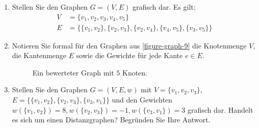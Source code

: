 \begin{enumerate}

\newpage

\item Stellen Sie den Graphen $G = (V, E)$ grafisch dar. Es gilt:
\begin{align*}
V & = \{v_1,v_2,v_3,v_4,v_5\} \\
E & =\{\{v_1,v_2\},\{v_2,v_3\},\{v_2,v_4\},\{v_4,v_5\},\{v_3,v_5\}\}
\end{align*}

\fillwithgrid{2in}

\item Notieren Sie formal für den Graphen aus \autoref{figure-graph-9} die Knotenmenge $V$, die Kantenmenge $E$ sowie die Gewichte für jede Kante $e \in E$.

\begin{figure}[htb]
\centering
{}
\caption{Ein bewerteter Graph mit $5$ Knoten.}
\label{figure-graph-9}
\end{figure}

\fillwithgrid{1in}

\item Stellen Sie den Graphen $G = (V, E, w)$ mit $V=\{v_1,v_2,v_3\}$, $E=\{\{v_1,v_2\},\{v_2,v_3\},\{v_3,v_1\}\}$ und den Gewichten $w(\{v_1,v_2\})=8, w(\{v_2,v_3\})=-1, w(\{v_3,v_1\})=3$ grafisch dar. Handelt es sich um einen Distanzgraphen? Begründen Sie Ihre Antwort.

\fillwithgrid{2in}

\end{enumerate}
